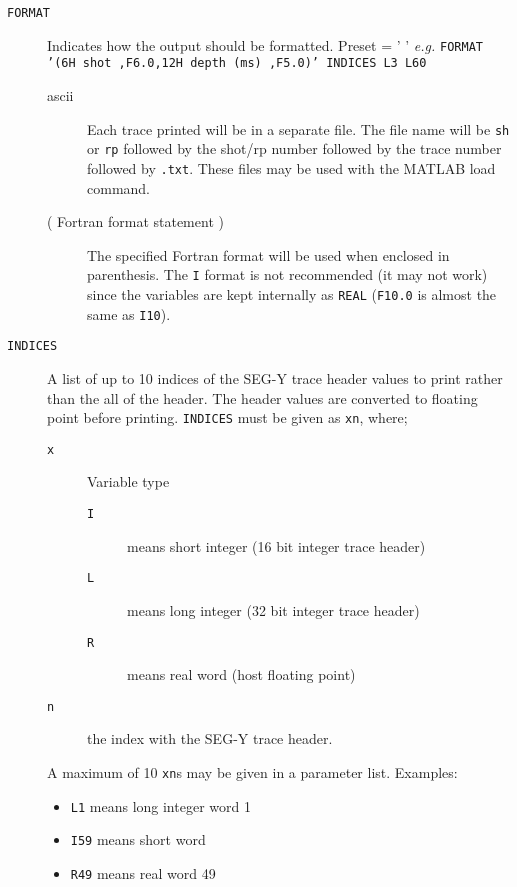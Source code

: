 \begin{description}
\item[\texttt{FORMAT}] Indicates how the output should be formatted.
         Preset = ' '      \textit{e.g.}
         \texttt{FORMAT '(6H shot ,F6.0,12H depth (ms) ,F5.0)' INDICES L3 L60}
\begin{description}
     \item[\gls{ascii}] Each trace printed will be in a separate file.  The file
         name will be \texttt{sh} or \texttt{rp} followed by the \gls{shot}/\gls{rp} number followed
         by the trace number followed by \texttt{.txt}.  These files may be used
         with the MATLAB load command.
     \item[( Fortran format statement )]  The specified Fortran format
         will be used when enclosed in parenthesis.  The \texttt{I} format is not
         recommended (it may not work) since the variables are kept
         internally as \texttt{REAL} (\texttt{F10.0} is almost the same as \texttt{I10}).
\end{description}

\item[\texttt{INDICES}] A list of up to 10 indices of the SEG-Y trace header values
          to print rather than the all of the header.  The header
          values are converted to floating point before printing.
          \texttt{INDICES} must be given as \texttt{xn}, where;
\begin{description}
    \item[\texttt{x}] Variable type
\begin{description}
    \item[\texttt{I}] means short integer (16 bit integer trace header)
    \item[\texttt{L}] means long integer (32 bit integer trace header)
    \item[\texttt{R}] means real word (host floating point)
\end{description}
    \item[\texttt{n}] the index with the SEG-Y trace header.
\end{description}
          A maximum of 10 \texttt{xn}s may be given in a parameter list.
          Examples:
          \begin{itemize}
              \item \texttt{L1} means long integer word 1
               \item \texttt{I59} means short word
              \item \texttt{R49}  means real word 49
          \end{itemize}


\end{description}
